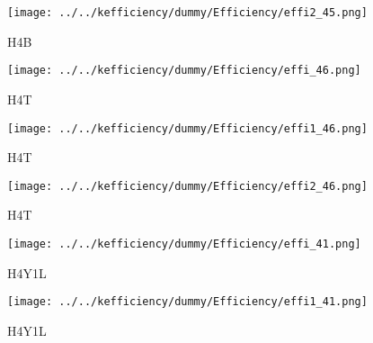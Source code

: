 \documentclass[10pt, xcolor={dvipsnames}, aspectratio = 169]{beamer}
\begin{document}
\begin{frame}

\begin{figure}
\centering
\texttt{[image: ../../kefficiency/dummy/Efficiency/effi2\_45.png]}
\caption{H4B}
\end{figure}

\end{frame}

\begin{frame}

\begin{figure}
\centering
\texttt{[image: ../../kefficiency/dummy/Efficiency/effi\_46.png]}
\caption{H4T}
\end{figure}

\end{frame}


\begin{frame}

\begin{figure}
\centering
\texttt{[image: ../../kefficiency/dummy/Efficiency/effi1\_46.png]}
\caption{H4T}
\end{figure}

\end{frame}


\begin{frame}

\begin{figure}
\centering
\texttt{[image: ../../kefficiency/dummy/Efficiency/effi2\_46.png]}
\caption{H4T}
\end{figure}

\end{frame}

\begin{frame}

\begin{figure}
\centering
\texttt{[image: ../../kefficiency/dummy/Efficiency/effi\_41.png]}
\caption{H4Y1L}
\end{figure}

\end{frame}


\begin{frame}

\begin{figure}
\centering
\texttt{[image: ../../kefficiency/dummy/Efficiency/effi1\_41.png]}
\caption{H4Y1L}
\end{figure}

\end{frame}
\end{document}
